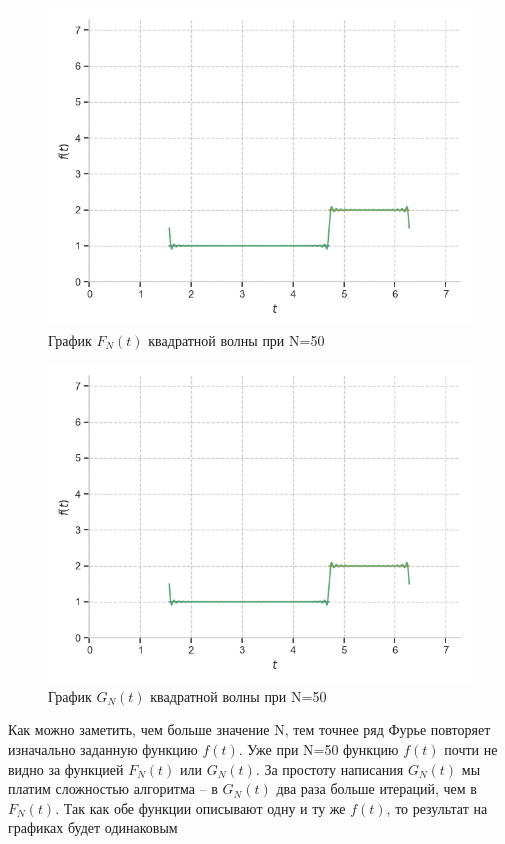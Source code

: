 \documentclass[a4paper, 16pt]{article}
\begin{document}
\begin{figure}[!htb]
    \centering
    \includegraphics[scale=0.8]{fur_sqwave_n=50.png}
    \captionsetup{skip=0pt}
    \caption{График $F_N(t)$ квадратной волны при N=50}
    \label{Рис:10}
\end{figure}
\begin{figure}[!htb]
    \centering
    \includegraphics[scale=0.8]{cfur_sqwave_n=50.png}
    \captionsetup{skip=0pt}
    \caption{График $G_N(t)$ квадратной волны при N=50}
    \label{Рис:11}
\end{figure}


\noindent Как можно заметить, чем больше значение N, тем точнее
ряд Фурье повторяет изначально заданную функцию $f(t)$. Уже при N=50
функцию $f(t)$ почти не видно за функцией $F_N(t)$ или $G_N(t)$. За простоту написания
$G_N(t)$ мы платим сложностью алгоритма -- в $G_N(t)$ два раза больше итераций, чем в $F_N(t)$.
Так как обе функции описывают одну и ту же $f(t)$, то результат на графиках будет одинаковым
\end{document}
